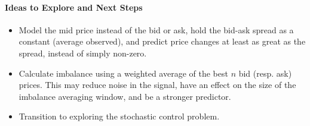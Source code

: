 \paragraph{Ideas to Explore and Next Steps}
\begin{itemize}
\item Model the mid price instead of the bid or ask, hold the bid-ask spread as a constant (average observed), and predict price changes at least as great as the spread, instead of simply non-zero.
\item Calculate imbalance using a weighted average of the best $n$ bid (resp. ask) prices. This may reduce noise in the signal, have an effect on the size of the imbalance averaging window, and be a stronger predictor.
\item Transition to exploring the stochastic control problem.
\end{itemize}
